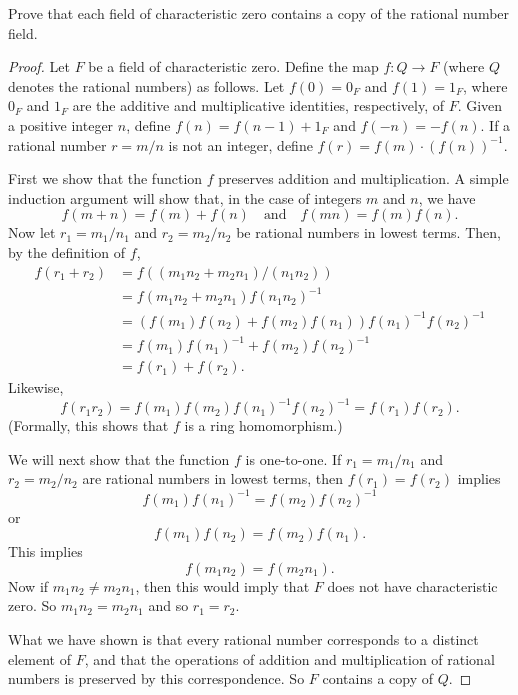  Prove that each field of characteristic zero contains a
copy of the rational number field.
\begin{proof}
  Let $F$ be a field of characteristic zero. Define the map
  $f\colon Q\to F$ (where $Q$ denotes the rational numbers) as
  follows. Let $f(0) = 0_F$ and $f(1) = 1_F$, where $0_F$ and $1_F$
  are the additive and multiplicative identities, respectively, of
  $F$. Given a positive integer $n$, define $f(n) = f(n - 1) + 1_F$
  and $f(-n) = -f(n)$. If a rational number $r = m/n$ is not an
  integer, define $f(r) = f(m)\cdot\left(f(n)\right)^{-1}$.

  First we show that the function $f$ preserves addition and
  multiplication. A simple induction argument will show that, in the
  case of integers $m$ and $n$, we have
  \begin{equation*}
    f(m + n) = f(m) + f(n)
    \quad\text{and}\quad
    f(mn) = f(m)f(n).
  \end{equation*}
  Now let $r_1 = m_1/n_1$ and $r_2 = m_2/n_2$ be rational numbers in
  lowest terms. Then, by the definition of $f$,
  \begin{align*}
    f(r_1 + r_2)
    &= f((m_1n_2 + m_2n_1)/(n_1n_2)) \\
    &= f(m_1n_2 + m_2n_1)f(n_1n_2)^{-1} \\
    &= (f(m_1)f(n_2) + f(m_2)f(n_1))f(n_1)^{-1}f(n_2)^{-1} \\
    &= f(m_1)f(n_1)^{-1} + f(m_2)f(n_2)^{-1} \\
    &= f(r_1) + f(r_2).
  \end{align*}
  Likewise,
  \begin{equation*}
    f(r_1r_2) = f(m_1)f(m_2)f(n_1)^{-1}f(n_2)^{-1}
    = f(r_1)f(r_2).
  \end{equation*}
  (Formally, this shows that $f$ is a ring homomorphism.)

  We will next show that the function $f$ is one-to-one. If
  $r_1 = m_1/n_1$ and $r_2 = m_2/n_2$ are rational numbers in lowest
  terms, then $f(r_1) = f(r_2)$ implies
  \begin{equation*}
    f(m_1)f(n_1)^{-1} = f(m_2)f(n_2)^{-1}
  \end{equation*}
  or
  \begin{equation*}
    f(m_1)f(n_2) = f(m_2)f(n_1).
  \end{equation*}
  This implies
  \begin{equation*}
    f(m_1n_2) = f(m_2n_1).
  \end{equation*}
  Now if $m_1n_2\neq m_2n_1$, then this would imply that $F$ does not
  have characteristic zero. So $m_1n_2 = m_2n_1$ and so $r_1 = r_2$.

  What we have shown is that every rational number corresponds to a
  distinct element of $F$, and that the operations of addition and
  multiplication of rational numbers is preserved by this
  correspondence. So $F$ contains a copy of $Q$.
\end{proof}
